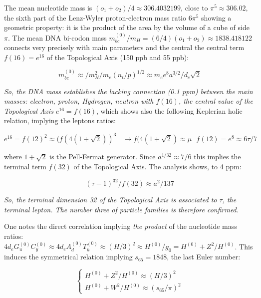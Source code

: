 \documentclass[a4paper,9pt]{article}
\newcounter{row}
\begin{document}
The mean nucleotide mass is $ (o_1 + o_2)/4 \approx 306.4032199$, close to $\pi^5 \approx 306.02$, the sixth part of the Lenz-Wyler proton-electron mass ratio \cite{Wyler} $6\pi^5$ showing a geometric property: it is the product of the area by the volume of a cube of side $\pi$. The mean DNA bi-codon mass  $m_{bc}^{(0)}/m_H = (6/4)(o_1 + o_2) \approx 1838.418122$ connects very precisely with main parameters and the central the central term $f(16)= e^{16}$ of the Topological Axis (150 ppb and 55 ppb):

\begin{equation}\label{Eq20}
m_{bc}^{(0)} \approx /m_H^2/m_e(n_t/p)^{1/2}  \approx m_ee^8 a^{3/2}/d_e \sqrt 2
 \end{equation}

\textit{So, the DNA mass establishes the lacking connection (0.1 ppm) between the main masses: electron, proton, Hydrogen, neutron with $f(16)$, the central value of the Topological Axis $e^{16} = f(16)$}, which shows also the following Keplerian holic relation, implying the leptons ratios: 

\begin{equation}\label{Eq18}
e^{16} = f(12)^2 \approx (f(4(1+\sqrt 2))^3 ~~~~ \rightarrow  f(4(1+\sqrt 2) \approx \mu ~~~ f(12) = e^8 \approx 6\tau/7
 \end{equation}

where $1+\sqrt 2$ is the Pell-Fermat generator. Since $a^{1/32}\approx 7/6$ this implies the terminal term $f(32)$ of the Topological Axis. The analysis shows, to 4 ppm:

\begin{equation}\label{Eq20}
(\tau -1)^{32}/f(32) \approx a^2/137
 \end{equation}
 
 \textit{So, the terminal dimension 32 of the Topological Axis is associated to $\tau$, the terminal lepton. The number three of particle families is therefore confirmed.}

One notes the direct correlation implying \textit{the product} of the nucleotide mass ratios: $4d_e G_u^{(0)} C_y^{(0)} \approx 4d_e A_d^{(0)} T_h^{(0)} \approx (H/3)^2 \approx H^{(0)}/g_0 = H^{(0)} + Z^2/H^{(0)}$. This induces the symmetrical relation implying $s_{65} = 1848$, the last Euler number:

\begin{equation}\label{Eq21}
 \left\{
    \begin{array}{ll}
        H^{(0)} + Z^2/H^{(0)} \approx (H/3)^2\\
        H^{(0)} + W^2/H^{(0)} \approx (s_{65}/\pi)^2
    \end{array}
\right.
\end{equation}
\end{document}
